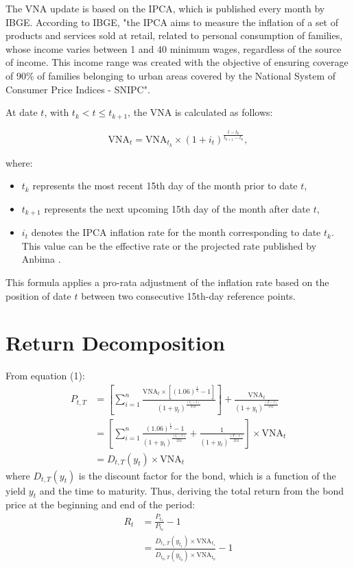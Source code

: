 \documentclass[10pt]{report}
\begin{document}
The VNA update is based on the IPCA, which is published every month by IBGE. According to IBGE, "the IPCA aims to measure the inflation of a set of products and services sold at retail, related to personal consumption of families, whose income varies between 1 and 40 minimum wages, regardless of the source of income. This income range was created with the objective of ensuring coverage of 90\% of families belonging to urban areas covered by the National System of Consumer Price Indices - SNIPC". \cite{ibge_ipca}

At date $t$, with $t_k<t \leq t_{k+1}$, the VNA is calculated as follows:

\begin{equation}
	\text{VNA}_{t} = \text{VNA}_{t_k} \times \left(1 + i_{t}\right)^{\frac{t - t_{k}}{t_{k+1}- t_{k}}},
\end{equation}

where:
\begin{itemize}
	\item $t_k$ represents the most recent 15th day of the month prior to date $t$,
	\item $t_{k+1}$ represents the next upcoming 15th day of the month after date $t$,
	\item $i_{t}$ denotes the IPCA inflation rate for the month corresponding to date $t_k$. This value can be the effective rate or the projected rate published by Anbima \cite{jose_valentim}.
\end{itemize}

This formula applies a pro-rata adjustment of the inflation rate based on the position of date $t$ between two consecutive 15th-day reference points.

\section*{Return Decomposition}

From equation (1):
\begin{align*}
	P_{t,T} & = \left[\sum_{i=1}^{n} \frac{\text{VNA}_{t} \times \left[(1.06)^{\frac{1}{2}}-1\right]}{(1+y_{t})^\frac{(t_{i}-t)}{252}}\right] + \frac{\text{VNA}_{t}}{(1+y_{t})^\frac{(T-t)}{252}} \\
	        & = \left[\sum_{i=1}^{n} \frac{(1.06)^{\frac{1}{2}}-1}{(1+y_{t})^\frac{(t_{i}-t)}{252}} + \frac{1}{(1+y_{t})^\frac{(T-t)}{252}}\right] \times \text{VNA}_{t}                           \\
	        & = D_{t,T}(y_{t}) \times \text{VNA}_{t}
\end{align*}
where $D_{t,T}(y_{t})$ is the discount factor for the bond, which is a function of the yield $y_{t}$ and the time to maturity. Thus, deriving the total return from the bond price at the beginning and end of the period:
\begin{align*}
	R_{t} & = \frac{P_{t_1}}{P_{t_0}} - 1                                                                      \\
	      & = \frac{D_{t_1,T}(y_{t_1}) \times \text{VNA}_{t_1}}{D_{t_0,T}(y_{t_0}) \times \text{VNA}_{t_0}} -1 \\
\end{align*}
\end{document}
